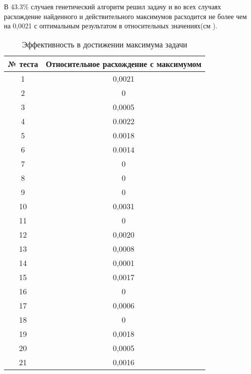 \FloatBarrier
В 43.3\% случаев генетический алгоритм решил задачу и во всех случаях расхождение найденного и действительного максимумов расходится не более чем на 0,0021 с оптимальным результатом в относительных значениях(см \cite{BigResults2}). 
\begin{table}[ht!]
	\centering
	\caption{Эффективность в достижении максимума задачи}
	\label{BigResults2}
	\begin{tabular}{|c|c|}
		\hline
		№ теста & Относительное расхождение с максимумом \\ \hline
		1       & 0,0021                                 \\ \hline
		2       & 0                                      \\ \hline
		3       & 0,0005                                 \\ \hline
		4       & 0.0022                                 \\ \hline
		5       & 0.0018                                 \\ \hline
		6       & 0.0014                                 \\ \hline
		7       & 0                                      \\ \hline
		8       & 0                                      \\ \hline
		9       & 0                                      \\ \hline
		10      & 0,0031                                 \\ \hline
		11      & 0                                      \\ \hline
		12      & 0,0020                                 \\ \hline
		13      & 0,0008                                 \\ \hline
		14      & 0,0001                                 \\ \hline
		15      & 0,0017                                 \\ \hline
		16      & 0                                      \\ \hline
		17      & 0,0006                                 \\ \hline
		18      & 0                                      \\ \hline
		19      & 0,0018                                 \\ \hline
		20      & 0,0005                                 \\ \hline
		21      & 0,0016                                 \\ \hline

\end{tabular}
\end{table}
